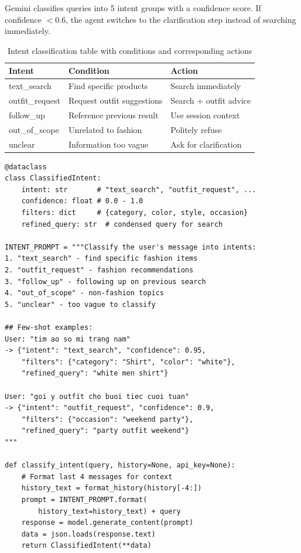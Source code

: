 \documentclass[12pt, twoside]{report}
\begin{document}
\begin{tcolorbox}[title=Method: LLM Few-shot Intent Classification]
Gemini classifies queries into 5 intent groups with a confidence score. If confidence $< 0.6$, the agent switches to the clarification step instead of searching immediately.
\end{tcolorbox}

\begin{table}[H]
\centering
\begin{tabular}{lll}
\toprule
\textbf{Intent} & \textbf{Condition} & \textbf{Action}\\
\midrule
text\_search    & Find specific products         & Search immediately\\
outfit\_request & Request outfit suggestions     & Search + outfit advice\\
follow\_up      & Reference previous result      & Use session context\\
out\_of\_scope  & Unrelated to fashion           & Politely refuse\\
unclear         & Information too vague          & Ask for clarification\\
\bottomrule
\end{tabular}
\caption{Intent classification table with conditions and corresponding actions}
\end{table}

\begin{lstlisting}[caption={Intent Classification --- agent/intent\_classifier.py}]
@dataclass
class ClassifiedIntent:
    intent: str       # "text_search", "outfit_request", ...
    confidence: float # 0.0 - 1.0
    filters: dict     # {category, color, style, occasion}
    refined_query: str  # condensed query for search

INTENT_PROMPT = """Classify the user's message into intents:
1. "text_search" - find specific fashion items
2. "outfit_request" - fashion recommendations
3. "follow_up" - following up on previous search
4. "out_of_scope" - non-fashion topics
5. "unclear" - too vague to classify

## Few-shot examples:
User: "tim ao so mi trang nam"
-> {"intent": "text_search", "confidence": 0.95,
    "filters": {"category": "Shirt", "color": "white"},
    "refined_query": "white men shirt"}

User: "goi y outfit cho buoi tiec cuoi tuan"
-> {"intent": "outfit_request", "confidence": 0.9,
    "filters": {"occasion": "weekend party"},
    "refined_query": "party outfit weekend"}
"""

def classify_intent(query, history=None, api_key=None):
    # Format last 4 messages for context
    history_text = format_history(history[-4:])
    prompt = INTENT_PROMPT.format(
        history_text=history_text) + query
    response = model.generate_content(prompt)
    data = json.loads(response.text)
    return ClassifiedIntent(**data)
\end{lstlisting}
\end{document}
